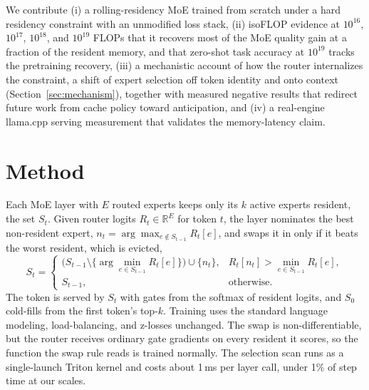 \documentclass{article}
\begin{document}
We contribute (i) a rolling-residency MoE trained from scratch under a hard residency constraint
with an unmodified loss stack, (ii) isoFLOP evidence at $10^{16}$, $10^{17}$, $10^{18}$, and $10^{19}$ FLOPs
that it recovers most of the MoE quality gain at a fraction of the resident memory, and that
zero-shot task accuracy at $10^{19}$ tracks the pretraining recovery, (iii) a mechanistic account
of how the router internalizes the constraint, a shift of expert selection off token identity and
onto context (Section~\ref{sec:mechanism}), together with measured negative results that redirect
future work from cache policy toward anticipation, and (iv) a real-engine llama.cpp serving
measurement that validates the memory-latency claim.

\section{Method}\label{sec:method}

Each MoE layer with $E$ routed experts keeps only its $k$ active experts resident, the set $S_t$.
Given router logits $R_t\in\mathbb{R}^E$ for token $t$, the layer nominates the best
non-resident expert, $n_t=\arg\max_{e\notin S_{t-1}}R_t[e]$, and swaps it in only if it beats the
worst resident, which is \mbox{evicted},
\begin{equation}
S_t=
\begin{cases}
\bigl(S_{t-1}\setminus\{\arg\min_{e\in S_{t-1}}R_t[e]\}\bigr)\cup\{n_t\}, & R_t[n_t]>\min_{e\in S_{t-1}}R_t[e],\\[1pt]
S_{t-1}, & \text{otherwise.}
\end{cases}
\end{equation}
The token is served by $S_t$ with gates from the softmax of
resident logits, and $S_0$ cold-fills from the first token's top-$k$. Training uses the standard language
modeling, load-balancing, and z-losses unchanged. The swap is non-differentiable, but the router
receives ordinary gate gradients on every resident it scores, so the function the swap rule reads
is trained normally. The selection scan runs as a single-launch Triton kernel and costs about 1\,ms
per layer call, under 1\% of step time at our scales.
\end{document}
